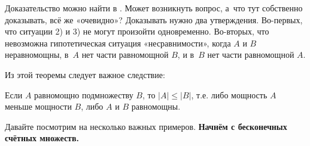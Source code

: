 \documentclass[12pt, a4paper]{article}
\begin{document}
\begin{rem} 
Доказательство можно найти в \cite{Shan:sets}. Может возникнуть вопрос, а~что тут собственно доказывать, всё же «очевидно»? Доказывать нужно два утверждения. Во-первых, что ситуации 2) и 3) не могут произойти одновременно. Во-вторых, что невозможна гипотетическая ситуация «несравнимости», когда $A$ и $B$ неравномощны, в~$A$ нет части равномощной $B$, и в~$B$ нет части равномощной $A$.
\end{rem}

Из этой теоремы следует важное следствие:

\begin{myth}
Если $A$ равномощно подмножеству $B$, то $ |A| \leq |B| $, т.е. либо мощность $A$ меньше мощности $B$, либо $A$ и $B$ равномощны.
\end{myth}

Давайте посмотрим на несколько важных примеров. \textbf{Начнём с бесконечных счётных множеств.}
\end{document}
